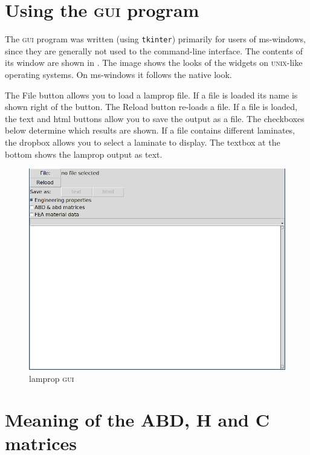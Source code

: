 \documentclass[a4paper,landscape,oneside,11pt,twocolumn]{memoir}
\begin{document}
\section{Using the \textsc{gui} program} %

The \textsc{gui} program was written (using \texttt{tkinter}) primarily for
users of ms-windows, since they are generally not used to the command-line
interface. The contents of its window are shown in . The
image shows the looks of the widgets on \textsc{unix}-like operating systems.
On ms-windows it follows the native look.

The \textsf{File} button allows you to load a lamprop file. If a file is
loaded its name is shown right of the button. The \textsf{Reload} button
re-loads a file.
If a file is loaded, the \textsf{text} and \textsf{html} buttons allow you
to save the output as a file.
The checkboxes below determine which results are shown. If
a file contains different laminates, the dropbox allows you to select
a laminate to display. The textbox at the bottom shows the lamprop output as
text.

\begin{figure}[!htbp]
  \centerline{\includegraphics[scale=0.5]{lamprop-gui.png}}
  \caption{\label{fig:lamprop-gui}lamprop \textsc{gui}}
\end{figure}



\section{Meaning of the ABD, H and C matrices} %
\end{document}
